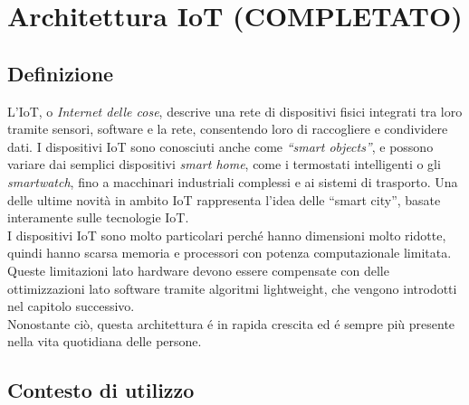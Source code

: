 \chapter{Architettura IoT (COMPLETATO)}

\section{Definizione}

L'IoT, o \textit{Internet delle cose}, descrive una rete di dispositivi fisici integrati tra loro tramite sensori, software e la rete, consentendo loro di raccogliere e condividere dati. I dispositivi IoT sono conosciuti anche come \textit{``smart objects''}, e possono variare dai semplici dispositivi \textit{smart home}, come i termostati intelligenti o gli \textit{smartwatch}, fino a macchinari industriali complessi e ai sistemi di trasporto. Una delle ultime novità in ambito IoT rappresenta l'idea delle ``smart city'', basate interamente sulle tecnologie IoT\cite{iot-intro}. \\

\noindent I dispositivi IoT sono molto particolari perché hanno dimensioni molto ridotte, quindi hanno scarsa memoria e processori con potenza computazionale limitata. Queste limitazioni lato hardware devono essere compensate con delle ottimizzazioni lato software tramite algoritmi lightweight, che vengono introdotti nel capitolo successivo. \\

\noindent Nonostante ciò, questa architettura é in rapida crescita ed é sempre più presente nella vita quotidiana delle persone.

\section{Contesto di utilizzo}

